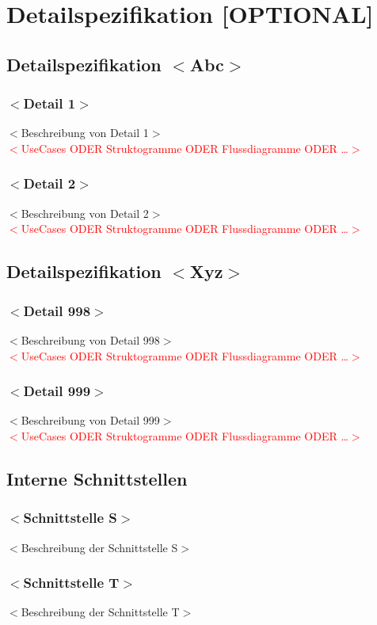 
	\chapter{Detailspezifikation [OPTIONAL]}
	\section{Detailspezifikation $<$Abc$>$}
    \subsection{$<$Detail 1$>$}
    $<$Beschreibung von Detail 1$>$\\
    \textcolor{red}{$<$UseCases ODER Struktogramme ODER Flussdiagramme ODER …$>$}
    \subsection{$<$Detail 2$>$}
   $<$Beschreibung von Detail 2$>$\\
   \textcolor{red}{$<$UseCases ODER Struktogramme ODER Flussdiagramme ODER …$>$}
    \section{Detailspezifikation $<$Xyz$>$}
    \subsection{$<$Detail 998$>$}
    $<$Beschreibung von Detail 998$>$\\
   \textcolor{red}{$<$UseCases ODER Struktogramme ODER Flussdiagramme ODER …$>$}
    \subsection{$<$Detail 999$>$}
    $<$Beschreibung von Detail 999$>$\\
   \textcolor{red}{$<$UseCases ODER Struktogramme ODER Flussdiagramme ODER …$>$}
    \section{Interne Schnittstellen}
    \subsection{$<$Schnittstelle S$>$}
    $<$Beschreibung der Schnittstelle S$>$
    \subsection{$<$Schnittstelle T$>$}
    $<$Beschreibung der Schnittstelle T$>$
